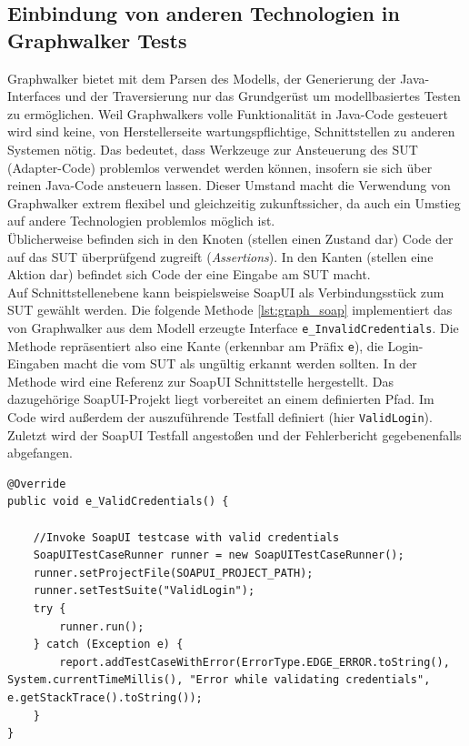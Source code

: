 \subsection{Einbindung von anderen Technologien in Graphwalker Tests}
Graphwalker bietet mit dem Parsen des Modells, der Generierung der Java-Interfaces und der Traversierung nur das Grundgerüst um modellbasiertes Testen zu ermöglichen. Weil Graphwalkers volle Funktionalität in Java-Code gesteuert wird sind keine, von Herstellerseite wartungspflichtige, Schnittstellen zu anderen Systemen nötig. Das bedeutet, dass Werkzeuge zur Ansteuerung des SUT (Adapter-Code) problemlos verwendet werden können, insofern sie sich über reinen Java-Code ansteuern lassen. Dieser Umstand macht die Verwendung von Graphwalker extrem flexibel und gleichzeitig zukunftssicher, da auch ein Umstieg auf andere Technologien problemlos möglich ist.\\
Üblicherweise befinden sich in den Knoten (stellen einen Zustand dar) Code der auf das SUT überprüfgend zugreift (\textit{Assertions}). In den Kanten (stellen eine Aktion dar) befindet sich Code der eine Eingabe am SUT macht.\\
Auf Schnittstellenebene kann beispielsweise SoapUI als Verbindungsstück zum SUT gewählt werden. Die folgende Methode \ref{lst:graph_soap} implementiert das von Graphwalker aus dem Modell erzeugte Interface \texttt{e\_InvalidCredentials}. Die Methode repräsentiert also eine Kante (erkennbar am Präfix \texttt{e}), die Login-Eingaben macht die vom SUT als ungültig erkannt werden sollten. In der Methode wird eine Referenz zur SoapUI Schnittstelle hergestellt. Das dazugehörige SoapUI-Projekt liegt vorbereitet an einem definierten Pfad. Im Code wird außerdem der auszuführende Testfall definiert (hier \texttt{ValidLogin}). Zuletzt wird der SoapUI Testfall angestoßen und der Fehlerbericht gegebenenfalls abgefangen.

\begin{lstlisting}[caption={Methode die ein von Graphwalker erzeugtes Interface implementiert und einen SoapUI-Testfall anstößt.}, label=lst:graph_soap]
@Override
public void e_ValidCredentials() {

    //Invoke SoapUI testcase with valid credentials
    SoapUITestCaseRunner runner = new SoapUITestCaseRunner();
    runner.setProjectFile(SOAPUI_PROJECT_PATH);
    runner.setTestSuite("ValidLogin");
    try {
        runner.run();
    } catch (Exception e) {
        report.addTestCaseWithError(ErrorType.EDGE_ERROR.toString(), System.currentTimeMillis(), "Error while validating credentials", e.getStackTrace().toString());
    }
}
\end{lstlisting}

